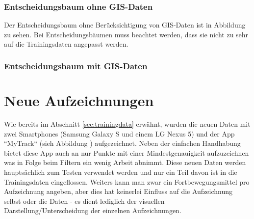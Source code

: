 
\subsubsection{Entscheidungsbaum ohne GIS-Daten}
Der Entscheidungsbaum ohne Berücksichtigung von GIS-Daten ist in Abbildung  zu sehen. Bei Entscheidungsbäumen muss beachtet werden, dass sie nicht zu sehr auf die Trainingsdaten angepasst werden.




\subsubsection{Entscheidungsbaum mit GIS-Daten}


\section{Neue Aufzeichnungen}
Wie bereits im Abschnitt \ref{sec:trainingdata} erwähnt, wurden die neuen Daten mit zwei Smartphones (Samsung Galaxy S und einem LG Nexus 5) und der App ``MyTrack`` (sieh Abbildung ) aufgezeichnet. Neben der einfachen Handhabung bietet diese App auch an nur Punkte mit einer Mindestgenauigkeit aufzuzeichnen was in Folge beim Filtern ein wenig Arbeit abnimmt. Diese neuen Daten werden hauptsächlich zum Testen verwendet werden und nur ein Teil davon ist in die Trainingsdaten eingeflossen. Weiters kann man zwar ein Fortbewegungsmittel pro Aufzeichnung angeben, aber dies hat keinerlei Einfluss auf die Aufzeichnung selbst oder die Daten - es dient lediglich der visuellen Darstellung/Unterscheidung der einzelnen Aufzeichnungen.


